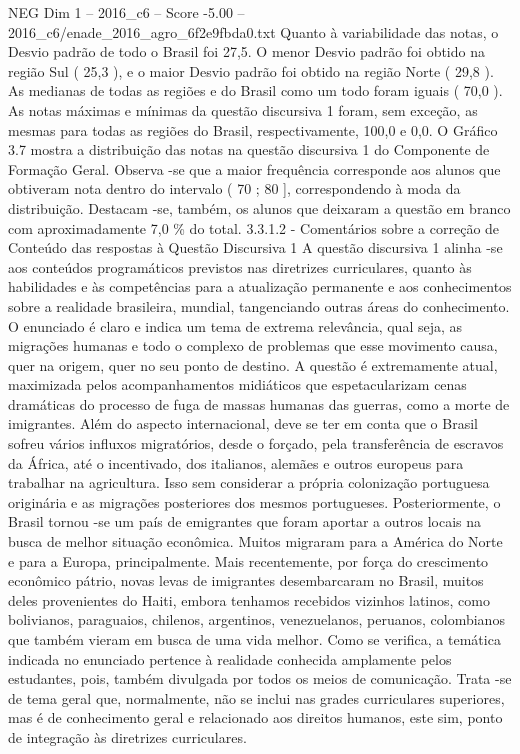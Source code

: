 \begin{textsample}{NEG Dim 1 – 2016\_c6 – Score -5.00 – 2016\_c6/enade\_2016\_agro\_6f2e9fbda0.txt}
Quanto à variabilidade das notas, o Desvio padrão de todo o Brasil foi 27,5.
O menor Desvio padrão foi obtido na região Sul ( 25,3 ), e o maior Desvio padrão foi obtido na região Norte ( 29,8 ).
As medianas de todas as regiões e do Brasil como um todo foram iguais ( 70,0 ).
As notas máximas e mínimas da questão discursiva 1 foram, sem exceção, as mesmas para todas as regiões do Brasil, respectivamente, 100,0 e 0,0.
O Gráfico 3.7 mostra a distribuição das notas na questão discursiva 1 do Componente de Formação Geral.
Observa -se que a maior frequência corresponde aos alunos que obtiveram nota dentro do intervalo ( 70 ; 80 ], correspondendo à moda da distribuição.
Destacam -se, também, os alunos que deixaram a questão em branco com aproximadamente 7,0 \% do total. 3.3.1.2 - Comentários sobre a correção de Conteúdo das respostas à Questão Discursiva 1 A questão discursiva 1 alinha -se aos conteúdos programáticos previstos nas diretrizes curriculares, quanto às habilidades e às competências para a atualização permanente e aos conhecimentos sobre a realidade brasileira, mundial, tangenciando outras áreas do conhecimento.
O enunciado é claro e indica um tema de extrema relevância, qual seja, as migrações humanas e todo o complexo de problemas que esse movimento causa, quer na origem, quer no seu ponto de destino.
A questão é extremamente atual, maximizada pelos acompanhamentos midiáticos que espetacularizam cenas dramáticas do processo de fuga de massas humanas das guerras, como a morte de imigrantes.
Além do aspecto internacional, deve se ter em conta que o Brasil sofreu vários influxos migratórios, desde o forçado, pela transferência de escravos da África, até o incentivado, dos italianos, alemães e outros europeus para trabalhar na agricultura.
Isso sem considerar a própria colonização portuguesa originária e as migrações posteriores dos mesmos portugueses.
Posteriormente, o Brasil tornou -se um país de emigrantes que foram aportar a outros locais na busca de melhor situação econômica.
Muitos migraram para a América do Norte e para a Europa, principalmente.
Mais recentemente, por força do crescimento econômico pátrio, novas levas de imigrantes desembarcaram no Brasil, muitos deles provenientes do Haiti, embora tenhamos recebidos vizinhos latinos, como bolivianos, paraguaios, chilenos, argentinos, venezuelanos, peruanos, colombianos que também vieram em busca de uma vida melhor.
Como se verifica, a temática indicada no enunciado pertence à realidade conhecida amplamente pelos estudantes, pois, também divulgada por todos os meios de comunicação.
Trata -se de tema geral que, normalmente, não se inclui nas grades curriculares superiores, mas é de conhecimento geral e relacionado aos direitos humanos, este sim, ponto de integração às diretrizes curriculares.

\end{textsample}
